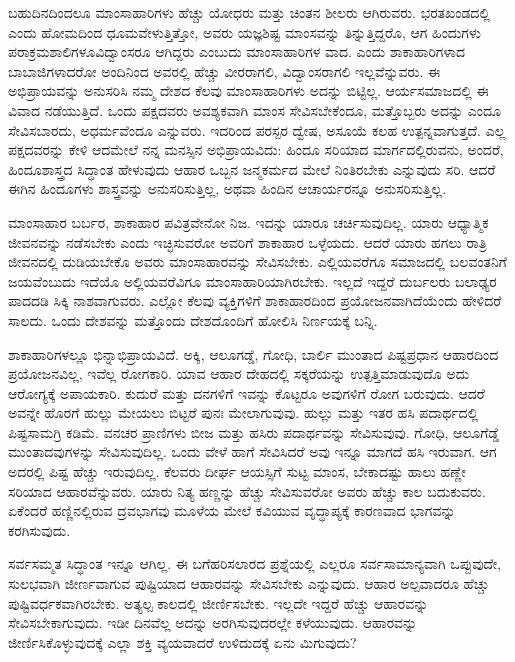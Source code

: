 ಬಹುದಿನದಿಂದಲೂ ಮಾಂಸಾಹಾರಿಗಳು ಹೆಚ್ಚು ಯೋಧರು ಮತ್ತು ಚಿಂತನ ಶೀಲರು ಆಗಿರುವರು. ಭರತಖಂಡದಲ್ಲಿ ಎಂದು ಹೋಮದಿಂದ ಧೂಮವೇಳುತ್ತಿತ್ತೋ, ಅವರು ಯಜ್ಞಶಿಷ್ಟ ಮಾಂಸವನ್ನು ತಿನ್ನುತ್ತಿದ್ದರೊ, ಆಗ ಹಿಂದುಗಳು ಪರಾಕ್ರಮಶಾಲಿಗಳೂ\break ವಿದ್ವಾಂಸರೂ ಆಗಿದ್ದರು ಎಂಬುದು ಮಾಂಸಾಹಾರಿಗಳ ವಾದ. ಎಂದು ಶಾಕಾಹಾರಿಗಳಾದ ಬಾಬಾಜಿಗಳಾದರೋ ಅಂದಿನಿಂದ ಅವರಲ್ಲಿ ಹೆಚ್ಚು ವೀರರಾಗಲಿ, ವಿದ್ವಾಂಸರಾಗಲಿ ಇಲ್ಲವೆನ್ನುವರು. ಈ ಅಭಿಪ್ರಾಯವನ್ನು ಅನುಸರಿಸಿ ನಮ್ಮ ದೇಶದ ಕೆಲವು ಮಾಂಸಾಹಾರಿ\break ಗಳು ಅದನ್ನು ಬಿಟ್ಟಿಲ್ಲ. ಆರ್ಯಸಮಾಜದಲ್ಲಿ ಈ ವಿವಾದ ನಡೆಯುತ್ತಿದೆ. ಒಂದು ಪಕ್ಷದವರು ಅವಶ್ಯಕವಾಗಿ ಮಾಂಸ ಸೇವಿಸಬೇಕೆಂದೂ, ಮತ್ತೊಬ್ಬರು ಅದನ್ನು ಎಂದೂ ಸೇವಿಸಬಾರದು, ಅಧರ್ಮವೆಂದೂ ಎನ್ನುವರು. ಇದರಿಂದ ಪರಸ್ಪರ ದ್ವೇಷ, ಅಸೂಯೆ ಕಲಹ ಉತ್ಪನ್ನವಾಗುತ್ತದೆ. ಎಲ್ಲ ಪಕ್ಷದವರನ್ನು ಕೇಳಿ ಆದಮೇಲೆ ನನ್ನ ಮನಸ್ಸಿನ ಅಭಿಪ್ರಾಯವಿದು: ಹಿಂದೂ ಸರಿಯಾದ ಮಾರ್ಗದಲ್ಲಿರುವನು, ಅಂದರೆ, ಹಿಂದೂಶಾಸ್ತ್ರದ ಸಿದ್ಧಾಂತ ಹೇಳುವುದು ಆಹಾರ ಒಬ್ಬನ ಜನ್ಮಕರ್ಮದ ಮೇಲೆ ನಿಂತಿರಬೇಕು ಎನ್ನುವುದು ಸರಿ. ಆದರೆ ಈಗಿನ ಹಿಂದೂಗಳು ಶಾಸ್ತ್ರವನ್ನು ಅನುಸರಿಸುತ್ತಿಲ್ಲ, ಅಥವಾ ಹಿಂದಿನ ಆಚಾರ್ಯರನ್ನೂ ಅನುಸರಿಸುತ್ತಿಲ್ಲ.

ಮಾಂಸಾಹಾರ ಬರ್ಬರ, ಶಾಕಾಹಾರ ಪವಿತ್ರವೇನೋ ನಿಜ. ಇದನ್ನು ಯಾರೂ ಚರ್ಚಿಸುವುದಿಲ್ಲ. ಯಾರು ಆಧ್ಯಾತ್ಮಿಕ ಜೀವನವನ್ನು ನಡೆಸಬೇಕು ಎಂದು ಇಚ್ಛಿಸುವರೋ ಅವರಿಗೆ ಶಾಕಾಹಾರ ಒಳ್ಳೆಯದು. ಆದರೆ ಯಾರು ಹಗಲು ರಾತ್ರಿ ಜೀವನದಲ್ಲಿ ದುಡಿಯ\break ಬೇಕೊ ಅವರು ಮಾಂಸಾಹಾರವನ್ನು ಸೇವಿಸಬೇಕು. ಎಲ್ಲಿಯವರೆಗೂ ಸಮಾಜದಲ್ಲಿ ಬಲವಂತನಿಗೆ ಜಯವೆಂಬುದು ಇದೆಯೊ ಅಲ್ಲಿಯವರೆವಿಗೂ ಮಾಂಸಾಹಾರಿಯಾಗಿರಬೇಕು. ಇಲ್ಲದೆ ಇದ್ದರೆ ದುರ್ಬಲರು ಬಲಾಢ್ಯರ ಪಾದದಡಿ ಸಿಕ್ಕಿ ನಾಶವಾಗುವರು. ಎಲ್ಲೋ ಕೆಲವು ವ್ಯಕ್ತಿಗಳಿಗೆ ಶಾಕಾಹಾರದಿಂದ ಪ್ರಯೋಜನವಾಗಿದೆಯೆಂದು ಹೇಳಿದರೆ ಸಾಲದು. ಒಂದು ದೇಶವನ್ನು ಮತ್ತೊಂದು ದೇಶದೊಂದಿಗೆ ಹೋಲಿಸಿ ನಿರ್ಣಯಕ್ಕೆ ಬನ್ನಿ.

\vfill\eject

ಶಾಕಾಹಾರಿಗಳಲ್ಲೂ ಭಿನ್ನಾಭಿಪ್ರಾಯವಿದೆ. ಅಕ್ಕಿ, ಆಲೂಗಡ್ಡೆ, ಗೋಧಿ, ಬಾರ್ಲಿ ಮುಂತಾದ ಪಿಷ್ಟಪ್ರಧಾನ ಆಹಾರದಿಂದ ಪ್ರಯೋಜನವಿಲ್ಲ, ಇವೆಲ್ಲ ರೋಗಕಾರಿ. ಯಾವ ಆಹಾರ ದೇಹದಲ್ಲಿ ಸಕ್ಕರೆಯನ್ನು ಉತ್ಪತ್ತಿಮಾಡುವುದೊ ಅದು ಆರೋಗ್ಯಕ್ಕೆ ಅಪಾಯಕಾರಿ. ಕುದುರೆ ಮತ್ತು ದನಗಳಿಗೆ ಇವನ್ನು ಕೊಟ್ಟರೂ ಅವುಗಳಿಗೆ ರೋಗ ಬರುವುದು. ಆದರೆ ಅವನ್ನೇ ಹೊರಗೆ ಹುಲ್ಲು ಮೇಯಲು ಬಿಟ್ಟರೆ ಪುನಃ ಮೇಲಾಗುವುವು. ಹುಲ್ಲು ಮತ್ತು ಇತರ ಹಸಿ ಪದಾರ್ಥದಲ್ಲಿ ಪಿಷ್ಟಸಾಮಗ್ರಿ ಕಡಿಮೆ. ವನಚರ ಪ್ರಾಣಿಗಳು ಬೀಜ ಮತ್ತು ಹಸಿರು ಪದಾರ್ಥವನ್ನು ಸೇವಿಸುವುವು. ಗೋಧಿ, ಆಲೂಗೆಡ್ಡೆ ಮುಂತಾದವುಗಳನ್ನು ಸೇವಿಸುವುದಿಲ್ಲ. ಒಂದು ವೇಳೆ ಹಾಗೆ ಸೇವಿಸಿದರೆ ಅವು ಇನ್ನೂ ಮಾಗದೆ ಹಸಿ ಇರುವಾಗ. ಆಗ ಅದರಲ್ಲಿ ಪಿಷ್ಟ ಹೆಚ್ಚು ಇರುವುದಿಲ್ಲ. ಕೆಲವರು ದೀರ್ಘ ಆಯಸ್ಸಿಗೆ ಸುಟ್ಟ ಮಾಂಸ, ಬೇಕಾದಷ್ಟು ಹಾಲು ಹಣ್ಣೇ ಸರಿಯಾದ ಆಹಾರವೆನ್ನುವರು. ಯಾರು ನಿತ್ಯ ಹಣ್ಣನ್ನು ಹೆಚ್ಚು ಸೇವಿಸುವರೋ ಅವರು ಹೆಚ್ಚು ಕಾಲ ಬದುಕುವರು. ಏಕೆಂದರೆ ಹಣ್ಣಿನಲ್ಲಿರುವ ದ್ರವಭಾಗವು ಮೂಳೆಯ ಮೇಲೆ ಕವಿಯುವ ವೃದ್ಧಾಪ್ಯಕ್ಕೆ ಕಾರಣವಾದ ಭಾಗವನ್ನು ಕರಗಿಸುವುದು.

ಸರ್ವಸಮ್ಮತ ಸಿದ್ಧಾಂತ ಇನ್ನೂ ಆಗಿಲ್ಲ. ಈ ಬಗೆಹರಿಸಲಾರದ ಪ್ರಶ್ನೆಯಲ್ಲಿ ಎಲ್ಲರೂ ಸರ್ವಸಾಮಾನ್ಯವಾಗಿ ಒಪ್ಪುವುದೇ, ಸುಲಭವಾಗಿ ಜೀರ್ಣವಾಗುವ ಪುಷ್ಟಿಯಾದ ಆಹಾರವನ್ನು ಸೇವಿಸಬೇಕು ಎನ್ನುವುದು. ಆಹಾರ ಅಲ್ಪವಾದರೂ ಹೆಚ್ಚು ಪುಷ್ಟಿವರ್ಧಕವಾಗಿರಬೇಕು. ಅತ್ಯಲ್ಪ ಕಾಲದಲ್ಲಿ ಜೀರ್ಣಿಸಬೇಕು. ಇಲ್ಲದೇ ಇದ್ದರೆ ಹೆಚ್ಚು ಆಹಾರವನ್ನು ಸೇವಿಸಬೇಕಾಗು\break ವುದು. ಇಡೀ ದಿನವೆಲ್ಲ ಅದನ್ನು ಅರಗಿಸುವುದರಲ್ಲೇ ಕಳೆಯುವುದು. ಆಹಾರವನ್ನು ಜೀರ್ಣಿಸಿಕೊಳ್ಳುವುದಕ್ಕೆ ಎಲ್ಲಾ ಶಕ್ತಿ ವ್ಯಯವಾದರೆ ಉಳಿದುದಕ್ಕೆ ಏನು ಮಿಗುವುದು?


